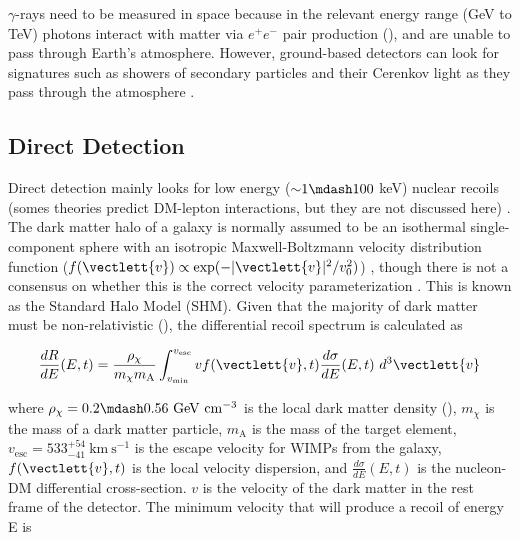 $\gamma$-rays need to be measured in space because in the relevant energy range (GeV to TeV) photons interact
with matter via $e^{+}e^{-}$ pair production (), and are unable to pass through Earth's atmosphere.  However,
ground-based detectors can look for signatures such as showers of secondary particles and their Cerenkov
light as they pass through the atmosphere .



\subsection{Direct Detection} \label{subsec:direct}
Direct detection mainly looks for low energy (${\sim} 1 \mdash 100$ keV) nuclear recoils (somes theories predict DM-lepton
interactions,
but they are not discussed here) .  The dark matter halo of a galaxy is normally assumed to be an isothermal
single-component sphere with an isotropic Maxwell-Boltzmann velocity distribution function
($f(\vectlett{v}) \propto \mathrm{exp}(-|\vectlett{v}|^2 / v_0^2)$) , though there is not a consensus on
whether this is the correct velocity parameterization
.  This is known as the Standard Halo Model (SHM).  Given that the majority of dark matter must be
non-relativistic (), the differential recoil spectrum is calculated as 

\begin{equation} \label{eq:dr_de}
\frac{dR}{dE}(E, t) = \frac{\rho_{\chi}}{m_{\chi}m_{\mathrm{A}}} \int_{v_{\mathrm{min}}}^{v_{\mathrm{esc}}}
v f(\vectlett{v}, t) \frac{d\sigma}{dE}(E, t)\ d^{3}\vectlett{v}
\end{equation}

\noindent where $\rho_{\chi} = 0.2 \mdash 0.56\ \mathrm{GeV\ cm^{-3}}$ is the local dark matter density (),
$m_{\chi}$ is the mass of a
dark matter particle, $m_{\mathrm{A}}$ is the mass of the target element, $v_{\mathrm{esc}}= 533_{-41}^{+54}\ \mathrm{km\ s^{-1}}$
 is the escape velocity for WIMPs from the
galaxy, $f(\vectlett{v}, t)$ is the local velocity dispersion, and $\frac{d\sigma}{dE}(E, t)$ is the nucleon-DM differential
cross-section.  $v$ is the velocity of the dark matter in the rest frame of the detector.  The minimum velocity that will produce
a recoil of energy E is

